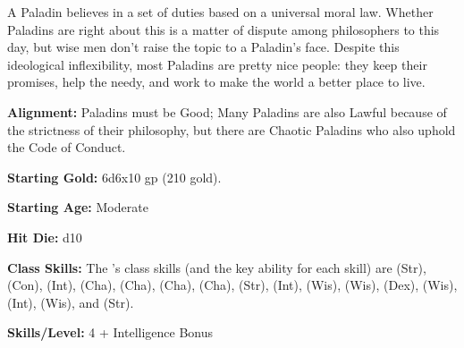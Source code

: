 
A Paladin believes in a set of duties based on a universal moral law. Whether Paladins are right about this is a matter of dispute among philosophers to this day, but wise men don't raise the topic to a Paladin's face. Despite this ideological inflexibility, most Paladins are pretty nice people: they keep their promises, help the needy, and work to make the world a better place to live.

\textbf{Alignment:} Paladins must be Good; Many Paladins are also Lawful because of the strictness of their philosophy, but there are Chaotic Paladins who also uphold the Code of Conduct.

\textbf{Starting Gold:} 6d6x10 gp (210 gold).

\textbf{Starting Age:} Moderate

\textbf{Hit Die:} d10

\textbf{Class Skills:} The \currentclassname{}'s class skills (and the key ability for each skill) are  (Str),  (Con),  (Int),  (Cha),  (Cha),  (Cha),  (Cha),  (Str),  (Int),  (Wis),  (Wis),  (Dex),  (Wis),  (Int),  (Wis), and  (Str).

\textbf{Skills/Level:} 4 + Intelligence Bonus

\goodbab{}
\poorfor{}
\poorref{}
\goodwil{}

